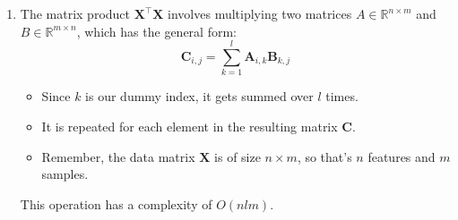 \begin{enumerate}
    \item The matrix product $\bm{X}^\top \bm{X}$ involves multiplying two matrices \( A \in \mathbb{R}^{n \times m} \) and \( B \in \mathbb{R}^{m \times n} \), which has the general form:
          \[
              \bm{C}_{i,j} = \sum_{k=1}^{l} \bm{A}_{i,k} \bm{B}_{k,j}
          \]
          \begin{itemize}
              \item Since $k$ is our dummy index, it gets summed over $l$ times.
              \item It is repeated for each element in the resulting matrix $\bm{C}$.
              \item Remember, the data matrix $\bm{X}$ is of size \( n \times m \), so that's \( n \) features and \( m \) samples.
          \end{itemize}
          This operation has a complexity of \( O(n l m) \).

          \begin{figure}
              \centering
\end{figure}
\end{enumerate}
